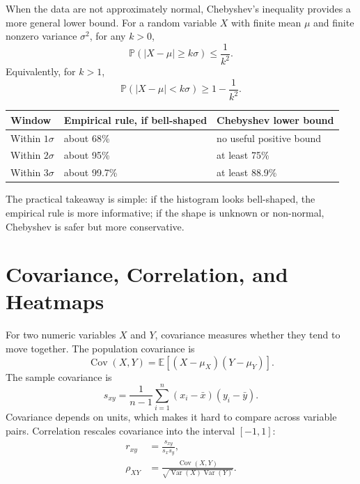 {When the data are not approximately normal, Chebyshev's inequality provides a more general lower bound.  For a random variable $X$ with finite mean $\mu$ and finite nonzero variance $\sigma^2$, for any $k>0$,
\begin{equation}
  \mathbb{P}(|X-\mu|\geq k\sigma)\leq \frac{1}{k^2}.
  \label{eq:ch4-chebyshev-tail}
\end{equation}
Equivalently, for $k>1$,
\begin{equation}
  \mathbb{P}(|X-\mu|<k\sigma)\geq 1-\frac{1}{k^2}.
  \label{eq:ch4-chebyshev-window}
\end{equation}

\begin{center}
\begin{tabular}{lll}
\hline
Window & Empirical rule, if bell-shaped & Chebyshev lower bound \\
\hline
Within $1\sigma$ & about 68\% & no useful positive bound \\
Within $2\sigma$ & about 95\% & at least 75\% \\
Within $3\sigma$ & about 99.7\% & at least 88.9\% \\
\hline
\end{tabular}
\end{center}

The practical takeaway is simple: if the histogram looks bell-shaped, the empirical rule is more informative; if the shape is unknown or non-normal, Chebyshev is safer but more conservative.

\section{Covariance, Correlation, and Heatmaps}

For two numeric variables $X$ and $Y$, covariance measures whether they tend to move together.  The population covariance is
\begin{equation}
  \operatorname{Cov}(X,Y)=\mathbb{E}[(X-\mu_X)(Y-\mu_Y)].
  \label{eq:ch4-pop-covariance}
\end{equation}
The sample covariance is
\begin{equation}
  s_{xy}=\frac{1}{n-1}\sum_{i=1}^n (x_i-\bar{x})(y_i-\bar{y}).
  \label{eq:ch4-sample-covariance}
\end{equation}
Covariance depends on units, which makes it hard to compare across variable pairs.  Correlation rescales covariance into the interval $[-1,1]$:
\begin{align}
  r_{xy}&=\frac{s_{xy}}{s_xs_y},
  \label{eq:ch4-sample-correlation}\\
  \rho_{XY}&=\frac{\operatorname{Cov}(X,Y)}{\sqrt{\operatorname{Var}(X)\operatorname{Var}(Y)}}.
  \label{eq:ch4-pop-correlation}
\end{align}

}
